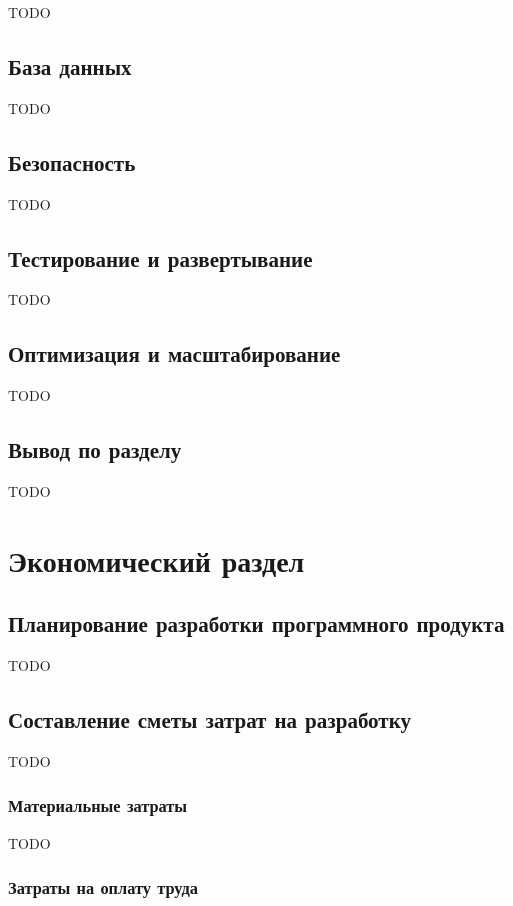 \documentclass{mirea}
\begin{document}
TODO

\subsection{База данных}

TODO

\subsection{Безопасность}

TODO

\subsection{Тестирование и развертывание}

TODO

\subsection{Оптимизация и масштабирование}

TODO

\subsection*{Вывод по разделу}

TODO

\section{Экономический раздел}

\subsection{Планирование разработки программного продукта}

TODO

\subsection{Составление сметы затрат на разработку}

TODO

\subsubsection{Материальные затраты}

TODO

\subsubsection{Затраты на оплату труда}
\end{document}
